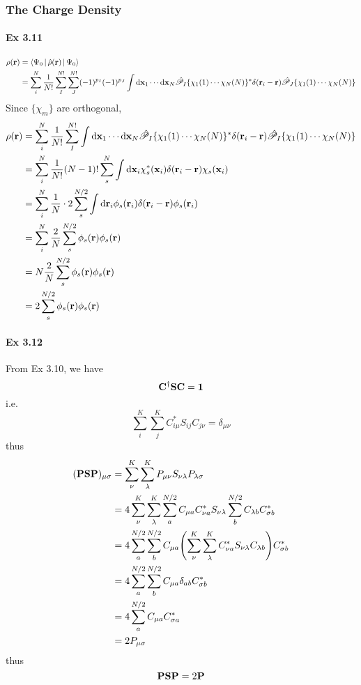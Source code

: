 \documentclass[a4paper]{article}
\newcommand{\iden}{{\large \bm{1}}}
\newcommand{\hsP}{\hat{\mathscr{P}}}
\newcommand{\ex}[1]{\paragraph{Ex #1}}
\numberwithin{equation}{subsection}
\begin{document}
\subsubsection{The Charge Density}
\ex{3.11}
\begin{align}
\rho(\vb{r}) &= \Braket{\Psi_0 | \hat{\rho}(\vb{r}) | \Psi_0} \notag\\
&= \sum_i^N \dfrac{1}{N!} \sum_I^{N!}\sum_J^{N!} (-1)^{p_I} (-1)^{p_J} \int \dd \vb{x}_1\cdots \dd \vb{x}_N \hsP_I\{\chi_1(1)\cdots\chi_N(N)\}^* \delta(\vb{r}_i - \vb{r}) \hsP_J\{\chi_1(1)\cdots\chi_N(N)\}
\end{align}
Since $ \{\chi_m\} $ are orthogonal,
\begin{align}
\rho(\vb{r}) 
&= \sum_i^N \dfrac{1}{N!} \sum_I^{N!} \int \dd \vb{x}_1\cdots \dd \vb{x}_N \hsP_I\{\chi_1(1)\cdots\chi_N(N)\}^* \delta(\vb{r}_i - \vb{r}) \hsP_I\{\chi_1(1)\cdots\chi_N(N)\} \notag\\
&= \sum_i^N \dfrac{1}{N!} (N-1)!\sum_s^N\int \dd \vb{x}_i \chi_s^*(\vb{x}_i) \delta(\vb{r}_i - \vb{r}) \chi_s(\vb{x}_i) \notag\\
&= \sum_i^N \dfrac{1}{N}\cdot 2\sum_s^{N/2}\int \dd \vb{r}_i \phi_s(\vb{r}_i) \delta(\vb{r}_i - \vb{r}) \phi_s(\vb{r}_i) \notag\\
&= \sum_i^N \dfrac{2}{N} \sum_s^{N/2} \phi_s(\vb{r}) \phi_s(\vb{r}) \notag\\
&= N \dfrac{2}{N} \sum_s^{N/2} \phi_s(\vb{r}) \phi_s(\vb{r}) \notag\\
&= 2 \sum_s^{N/2} \phi_s(\vb{r}) \phi_s(\vb{r}) 
\end{align}

\ex{3.12}
From Ex 3.10, we have
\begin{equation}\label{key}
\vb{C}^\dagger \vb{S} \vb{C} = \iden
\end{equation}
i.e.
\begin{equation}\label{key}
\sum_i^K\sum_j^K C^*_{i\mu} S_{ij} C_{j\nu} = \delta_{\mu\nu}
\end{equation}
thus
\begin{align}
(\vb{P}\vb{S}\vb{P})_{\mu\sigma} &= \sum_\nu^K\sum_\lambda^K P_{\mu\nu} S_{\nu\lambda} P_{\lambda\sigma} \notag\\
&= 4\sum_\nu^K\sum_\lambda^K \sum_a^{N/2}C_{\mu a}C_{\nu a}^* S_{\nu\lambda} \sum_b^{N/2}C_{\lambda b}C_{\sigma b}^* \notag\\
&= 4\sum_a^{N/2}\sum_b^{N/2} C_{\mu a}\qty(\sum_\nu^K\sum_\lambda^K C_{\nu a}^* S_{\nu\lambda} C_{\lambda b}) C_{\sigma b}^* \notag\\
&= 4\sum_a^{N/2}\sum_b^{N/2}  C_{\mu a} \delta_{ab} C_{\sigma b}^* \notag\\
&= 4\sum_a^{N/2} C_{\mu a} C_{\sigma a}^* \notag\\
&= 2 P_{\mu\sigma}
\end{align}
thus
\begin{equation}\label{key}
\vb{P}\vb{S}\vb{P} = 2\vb{P}
\end{equation}
\end{document}
